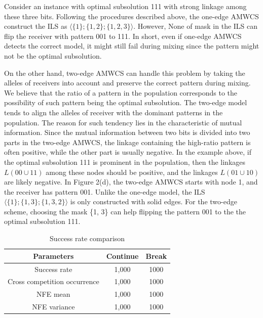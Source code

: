 \documentclass{sig-alternate-05-2015}
\begin{document}
Consider an instance with  optimal subsolution 111 with  strong  linkage among these three bits. Following the procedures described above, the one-edge AMWCS construct the ILS as $\langle\{1\}; \{1, 2\}; \{1, 2, 3\}\rangle$. However, None of mask in the ILS can flip the receiver with pattern 001 to 111. In short, even if one-edge AMWCS detects the correct model, it might still fail during mixing since the pattern might not be the optimal subsolution.


On the other hand, two-edge AMWCS can handle this problem by taking the alleles of receivers into account and preserve the correct pattern during mixing. We believe that the ratio of a pattern in the population corresponds to the possibility of such pattern being the optimal subsolution. The two-edge model tends to align the alleles of receiver  with the dominant patterns in the population. The reason for such tendency lies in the characteristic of mutual information. Since the mutual information between two bits is divided into two parts in the two-edge AMWCS,  the  linkage containing the high-ratio pattern  is often positive, while the other part is usually negative.  In the example above, if the optimal subsolution 111 is prominent in the population, then the linkages $L(00\cup11)$ among these nodes should be positive, and the linkages $L(01\cup10)$ are likely negative.  In Figure 2(d), the two-edge AMWCS starts with node 1, and the receiver has pattern  001. Unlike the one-edge model, the ILS  $\langle\{1\}; \{1, 3\}; \{1, 3, 2\}\rangle$ is only constructed with solid edges. For the two-edge scheme, choosing the mask \{1, 3\} can help flipping the pattern 001 to the the optimal subsolution 111.    


\begin{table}[ht]
\centering
\begin{tabular}{ |c|c|c| } \hline
Parameters & Continue & Break \\ \hline
Success rate 					& 1,000& 1000\\ \hline
Cross competition occurrence	& 1,000& 1000\\ \hline
NFE mean				 		& 1,000& 1000\\ \hline
NFE variance					& 1,000& 1000\\ \hline
\end{tabular}
\caption{Success rate comparison}
\end{table}
\end{document}
